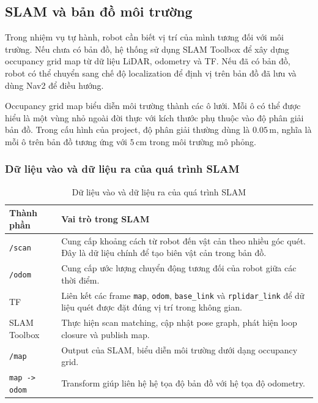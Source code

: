 \subsection{SLAM và bản đồ môi trường}
\label{subsec:slam-map}

Trong nhiệm vụ tự hành, robot cần biết vị trí của mình tương đối với môi trường. Nếu chưa có bản đồ, hệ thống sử dụng SLAM Toolbox để xây dựng occupancy grid map từ dữ liệu LiDAR, odometry và TF. Nếu đã có bản đồ, robot có thể chuyển sang chế độ localization để định vị trên bản đồ đã lưu và dùng Nav2 để điều hướng.

Occupancy grid map biểu diễn môi trường thành các ô lưới. Mỗi ô có thể được hiểu là một vùng nhỏ ngoài đời thực với kích thước phụ thuộc vào độ phân giải bản đồ. Trong cấu hình của project, độ phân giải thường dùng là $0.05\,\mathrm{m}$, nghĩa là mỗi ô trên bản đồ tương ứng với $5\,\mathrm{cm}$ trong môi trường mô phỏng.

\subsubsection{Dữ liệu vào và dữ liệu ra của quá trình SLAM}
\label{subsubsec:slam-io}

\begin{table}[H]
    \centering
    \caption{Dữ liệu vào và dữ liệu ra của quá trình SLAM}
    \label{tab:slam-io}
    \renewcommand{\arraystretch}{1.25}
    \small
    \begin{tabularx}{\textwidth}{|>{\raggedright\arraybackslash}p{}|>{\raggedright\arraybackslash}X|}
        \hline
        \textbf{Thành phần} & \textbf{Vai trò trong SLAM} \\
        \hline
        \texttt{/scan} & Cung cấp khoảng cách từ robot đến vật cản theo nhiều góc quét. Đây là dữ liệu chính để tạo biên vật cản trong bản đồ. \\
        \hline
        \texttt{/odom} & Cung cấp ước lượng chuyển động tương đối của robot giữa các thời điểm. \\
        \hline
        TF & Liên kết các frame \texttt{map}, \texttt{odom}, \texttt{base\_link} và \texttt{rplidar\_link} để dữ liệu quét được đặt đúng vị trí trong không gian. \\
        \hline
        SLAM Toolbox & Thực hiện scan matching, cập nhật pose graph, phát hiện loop closure và publish map. \\
        \hline
        \texttt{/map} & Output của SLAM, biểu diễn môi trường dưới dạng occupancy grid. \\
        \hline
        \texttt{map -> odom} & Transform giúp liên hệ hệ tọa độ bản đồ với hệ tọa độ odometry. \\
        \hline
    \end{tabularx}
\end{table}

